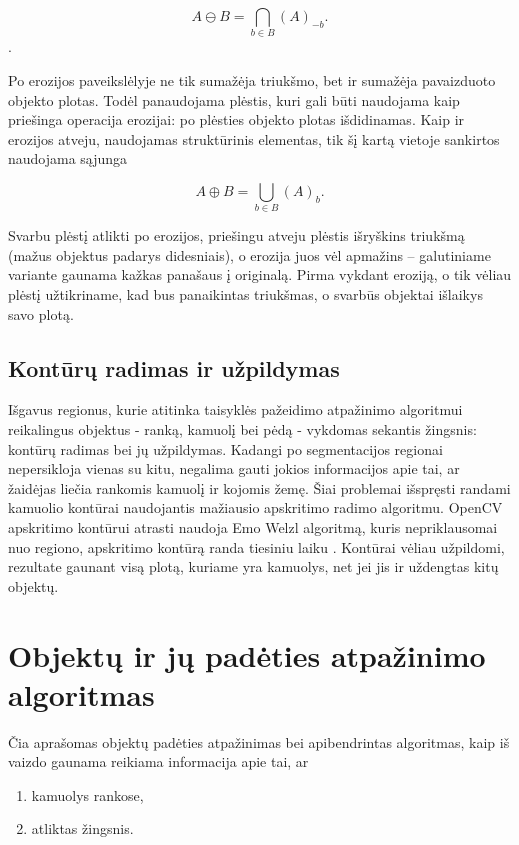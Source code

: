 \documentclass{VUMIFPSkursinis}
\begin{document}
\begin{equation}\label{eq:erozija}
A \ominus B = \bigcap_ {b \in B } (A)_{-b} .
\end{equation}.

Po erozijos paveikslėlyje ne tik sumažėja triukšmo, bet ir sumažėja pavaizduoto objekto plotas. Todėl panaudojama plėstis, kuri gali būti naudojama kaip priešinga operacija erozijai: po plėsties objekto plotas išdidinamas. Kaip ir erozijos atveju, naudojamas struktūrinis elementas, tik šį kartą vietoje sankirtos naudojama sąjunga \cite{ImageAnalysisMorph}

\begin{equation}\label{eq:plestis}
A \oplus B = \bigcup_ {b \in B } (A)_{b} .
\end{equation}

Svarbu plėstį atlikti po erozijos, priešingu atveju plėstis išryškins triukšmą (mažus objektus padarys didesniais), o erozija juos vėl apmažins – galutiniame variante gaunama kažkas panašaus į originalą. Pirma vykdant eroziją, o tik vėliau plėstį užtikriname, kad bus panaikintas triukšmas, o svarbūs objektai išlaikys savo plotą. 

\subsection{Kontūrų radimas ir užpildymas}
Išgavus regionus, kurie atitinka taisyklės pažeidimo atpažinimo algoritmui reikalingus objektus - ranką, kamuolį bei pėdą - vykdomas sekantis žingsnis: kontūrų radimas bei jų užpildymas. Kadangi po segmentacijos regionai nepersikloja vienas su kitu, negalima gauti jokios informacijos apie tai, ar žaidėjas liečia rankomis kamuolį ir kojomis žemę. Šiai problemai išspręsti randami kamuolio kontūrai naudojantis mažiausio apskritimo radimo algoritmu. OpenCV apskritimo kontūrui atrasti naudoja Emo Welzl algoritmą, kuris nepriklausomai nuo regiono, apskritimo kontūrą randa tiesiniu laiku \cite{smallestenclosing}. Kontūrai vėliau užpildomi, rezultate gaunant visą plotą, kuriame yra kamuolys, net jei jis ir uždengtas kitų objektų.

\section{Objektų ir jų padėties atpažinimo algoritmas}
Čia aprašomas objektų padėties atpažinimas bei apibendrintas algoritmas, kaip iš vaizdo gaunama reikiama informacija apie tai, ar 
\begin{enumerate}
	\item kamuolys rankose, 
	\item atliktas žingsnis.
\end{enumerate}
\end{document}
